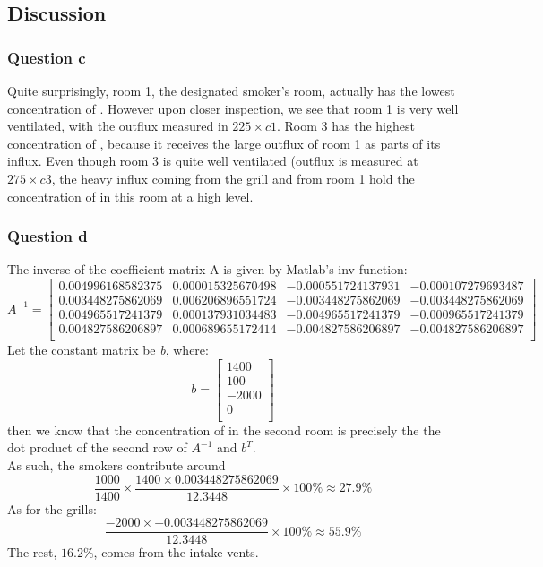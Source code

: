 \documentclass{article}
\begin{document}
    \subsection{Discussion}
    \subsubsection{Question c}
    Quite surprisingly, room 1, the designated smoker's room, actually has the lowest concentration of . However upon closer inspection, we see that room 1 is very well ventilated, with the outflux measured in ${225 \times c1}$. Room 3 has the highest concentration of , because it receives the large outflux of room 1 as parts of its influx. Even though room 3 is quite well ventilated (outflux is measured at ${275 \times c3}$, the heavy influx coming from the grill and from room 1 hold the concentration of  in this room at a high level.
    \subsubsection{Question d}
    The inverse of the coefficient matrix A is given by Matlab's inv function:
     \[
   		A^{-1}=
  		\left[ {\begin{array}{cccc}
   		0.004996168582375 &  0.000015325670498 & -0.000551724137931 & -0.000107279693487\\
   		0.003448275862069 & 0.006206896551724 & -0.003448275862069 & -0.003448275862069\\
   		0.004965517241379 & 0.000137931034483 & -0.004965517241379 & -0.000965517241379\\
   		0.004827586206897 & 0.000689655172414  & -0.004827586206897 & -0.004827586206897\\
  		\end{array} } \right]
	\]
	Let the constant matrix be \emph{b}, where:
	\[
   		b=
  		\left[ {\begin{array}{c}
   		1400\\
   		100\\
   		-2000\\
   		0\\
  		\end{array} } \right]
	\]
	then we know that the concentration of  in the second room is precisely the the dot product of the second row of ${A^{-1}}$ and ${b^{T}}$.\\
	As such, the smokers contribute around
	\[\frac{1000}{1400} \times \frac{1400 \times 0.003448275862069}{12.3448} \times 100\% \approx 27.9\%\]
	As for the grills:
	\[\frac{-2000 \times -0.003448275862069}{12.3448} \times 100\% \approx 55.9\%\]
	The rest, ${16.2\%}$, comes from the intake vents.
\end{document}
